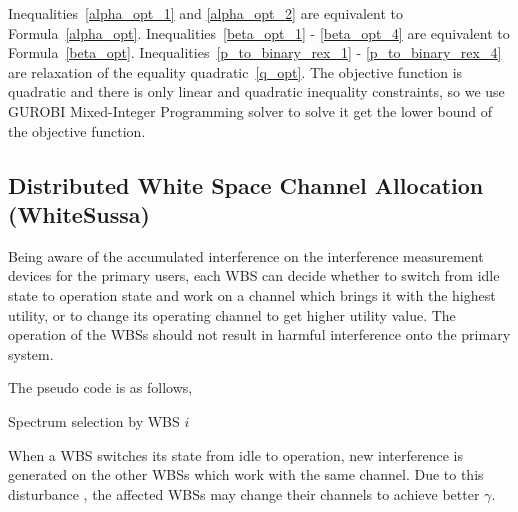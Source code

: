\documentclass[times]{ettauth}
\theoremstyle{mytheoremstyle}
\theoremstyle{mytheoremstyle}
\theoremstyle{mytheoremstyle}
\begin{document}
Inequalities~\ref{alpha_opt_1} and \ref{alpha_opt_2} are equivalent to Formula~\ref{alpha_opt}.
Inequalities~\ref{beta_opt_1} - \ref{beta_opt_4} are equivalent to Formula~\ref{beta_opt}.
Inequalities~\ref{p_to_binary_rex_1} - \ref{p_to_binary_rex_4} are relaxation of the equality quadratic~\ref{q_opt}.
The objective function is quadratic and there is only linear and quadratic inequality constraints, so we use GUROBI Mixed-Integer Programming solver to solve it get the lower bound of the objective function.

\subsection{Distributed White Space Channel Allocation (WhiteSussa)}
Being aware of the accumulated interference on the interference measurement devices for the primary users, each WBS can decide whether to switch from idle state to operation state and work on a channel which brings it with the highest utility, or to change its operating channel to get higher utility value.
The operation of the WBSs should not result in harmful interference onto the primary system.

The pseudo code is as follows,

\begin{algorithm}[h]
\caption{Spectrum selection by WBS $i$}          %
\label{whiteSussAlgo} 
\DontPrintSemicolon
\SetAlgoLined
{}

	\end{algorithm}


When a WBS switches its state from idle to operation, new interference is generated on the other WBSs which work with the same channel.
Due to this disturbance , the affected WBSs may change their channels to achieve better $\gamma$.
\end{document}
